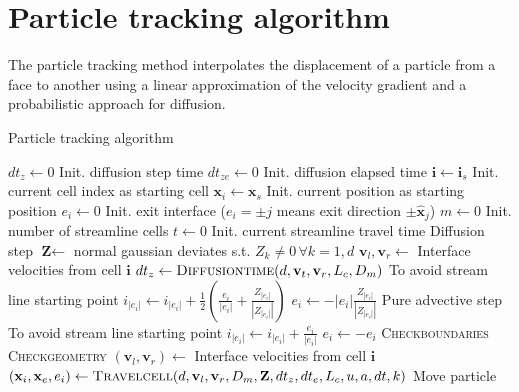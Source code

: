 \chapter{Particle tracking algorithm}
The particle tracking method interpolates the displacement of a particle from a face to another using a linear approximation of the velocity gradient and a probabilistic approach for diffusion.

\begin{algorithm}[H]
	\caption{Particle tracking algorithm}
	\label{alg:part_track}
	\begin{algorithmic}[1]
		\State $dt_z\leftarrow0$ \Comment Init. diffusion step time
		\State $dt_{ze}\leftarrow0$ \Comment	Init. diffusion elapsed time
		\State $\textbf{i}\leftarrow \textbf{i}_s$ \Comment Init. current cell index as starting cell
		\State $\textbf{x}_i\leftarrow \textbf{x}_s$ \Comment Init. current position as starting position
		\State $e_i\leftarrow0$ \Comment Init. exit interface ($e_i=\pm j$ means exit direction $\pm\hat{\textbf{x}}_j$)
		\State $m\leftarrow0$ \Comment Init. number of streamline cells
		\State $t\leftarrow0$ \Comment Init. current streamline travel time
		\Repeat
		 \Comment Diffusion step
			\State $\textbf{Z}\leftarrow $ normal gaussian deviates s.t. $Z_k\neq0\,\forall k=1,d$
			\State $\textbf{v}_l,\textbf{v}_r$$\leftarrow$ Interface velocities from cell $\textbf{i}$
			\State $dt_z\leftarrow\textsc{Diffusiontime}(d,\textbf{v}_t,\textbf{v}_r,L_c,D_m)$
			 \Comment To avoid stream line starting point
				\State $i_{|e_i|}\leftarrow i_{|e_i|} + \frac{1}{2}(\frac{e_i}{|e_i|}+\frac{Z_{|e_i|}}{|Z_{|e_i|}|}) $
				\State $e_i \leftarrow -|e_i|\frac{Z_{|e_i|}}{|Z_{|e_i|}|}$ 
			\EndIf
		\Else \Comment Pure advective step
			 \Comment To avoid stream line starting point
				\State $i_{|e_i|}\leftarrow i_{|e_i|} + \frac{e_i}{|e_i|} $ 
				\State $e_i \leftarrow -e_i$ 
			\EndIf
		\EndIf
		\State \textsc{Checkboundaries}
		\State \textsc{Checkgeometry}
		\State $(\textbf{v}_l,\textbf{v}_r)$$\leftarrow$ Interface velocities from cell $\textbf{i}$
		\State $(\textbf{x}_i,\textbf{x}_e,e_i)\leftarrow\textsc{Travelcell}(d, \textbf{v}_l, \textbf{v}_r, D_m, \textbf{Z}, dt_z, dt_e,L_c, u, a, dt, k)$ 
		\Comment Move particle
		\EndProcedure
	\end{algorithmic}
\end{algorithm}

